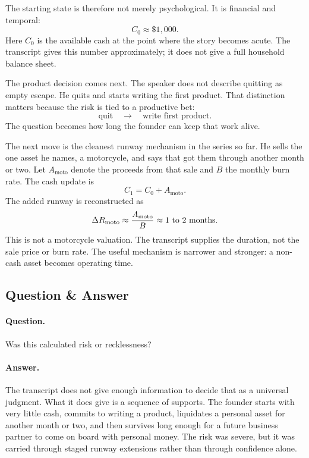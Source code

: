 \documentclass[11pt,oneside]{book}
\begin{document}
The starting state is therefore not merely psychological. It is financial and temporal:
\[
C_0 \approx \$1{,}000.
\]
Here \(C_0\) is the available cash at the point where the story becomes acute. The transcript gives this number approximately; it does not give a full household balance sheet.

The product decision comes next. The speaker does not describe quitting as empty escape. He quits and starts writing the first product. That distinction matters because the risk is tied to a productive bet:
\[
\text{quit}
\quad\longrightarrow\quad
\text{write first product}.
\]
The question becomes how long the founder can keep that work alive.

The next move is the cleanest runway mechanism in the series so far. He sells the one asset he names, a motorcycle, and says that got them through another month or two. Let \(A_{\mathrm{moto}}\) denote the proceeds from that sale and \(B\) the monthly burn rate. The cash update is
\[
C_1=C_0+A_{\mathrm{moto}}.
\]
The added runway is reconstructed as
\[
\Delta R_{\mathrm{moto}}
\approx
\frac{A_{\mathrm{moto}}}{B}
\approx
1\text{ to }2\ \hbox{months}.
\]
This is not a motorcycle valuation. The transcript supplies the duration, not the sale price or burn rate. The useful mechanism is narrower and stronger: a non-cash asset becomes operating time.

\subsection{Question \& Answer}

\paragraph{Question.}
Was this calculated risk or recklessness?

\paragraph{Answer.}
The transcript does not give enough information to decide that as a universal judgment. What it does give is a sequence of supports. The founder starts with very little cash, commits to writing a product, liquidates a personal asset for another month or two, and then survives long enough for a future business partner to come on board with personal money. The risk was severe, but it was carried through staged runway extensions rather than through confidence alone.
\end{document}
